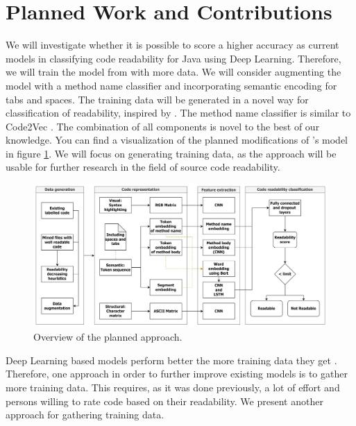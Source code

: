 \documentclass[%
class=scrreprt,
chapterprefix=false,%
open=right,%
twoside=false,%
paper=a4,%
logofile={Logo\_zentral\_farbig\_EN.png},%
thesistype=masterproposal,%
UKenglish,%
]{se2thesis}
\begin{document}
	\section{Planned Work and Contributions} \label{Planned Work and Contributions}
	We will investigate whether it is possible to score a higher accuracy as current models in classifying code readability for Java using Deep Learning. Therefore, we will train the model from \citeauthor{mi2022towards} \cite{mi2022towards} with more data. We will consider augmenting the model with a method name classifier and incorporating semantic encoding for tabs and spaces. The training data will be generated in a novel way for classification of readability, inspired by \citeauthor{loriot2022styler} \cite{loriot2022styler}. The method name classifier is similar to Code2Vec \cite{alon2019code2vec}. The combination of all components is novel to the best of our knowledge. You can find a visualization of the planned modifications of \citeauthor{mi2022towards}'s model in figure \ref{fig:model_pipeline}. We will focus on generating training data, as the approach will be usable for further research in the field of source code readability.\\
	
	\begin{figure}[t]
		\centering
		\includegraphics[width=\textwidth]{Model_pipeline.png}
		\caption{Overview of the planned approach.}
		\label{fig:model_pipeline}
	\end{figure}
	
	Deep Learning based models perform better the more training data they get \cite{hestness2017deep}. Therefore, one approach in order to further improve existing models is to gather more training data.
	This requires, as it was done previously, a lot of effort and persons willing to rate code based on their readability. We present another approach for gathering training data.
	
\end{document}
